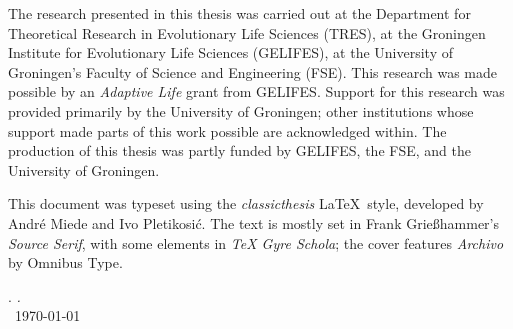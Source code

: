 \thispagestyle{empty}

\hfill

\vfill


\noindent The research presented in this thesis was carried out at the Department for Theoretical Research in Evolutionary Life Sciences (TRES), at the Groningen Institute for Evolutionary Life Sciences (GELIFES), at the University of Groningen's Faculty of Science and Engineering (FSE).
This research was made possible by an \emph{Adaptive Life} grant from GELIFES.
Support for this research was provided primarily by the University of Groningen; other institutions whose support made parts of this work possible are acknowledged within.
The production of this thesis was partly funded by GELIFES, the FSE, and the University of Groningen.

\medskip

\noindent This document was typeset using the \emph{classicthesis} \LaTeX~style, developed by Andr\'e Miede and Ivo Pletikosić.
The text is mostly set in Frank Grie{\ss}hammer's \emph{Source Serif}, with some elements in \emph{TeX Gyre Schola}; the cover features \emph{Archivo} by Omnibus Type.

\bigskip

\noindent\finalVersionString

\noindent\myName. \textit{\myTitle.}%
\\
\noindent \textcopyright\ \today
